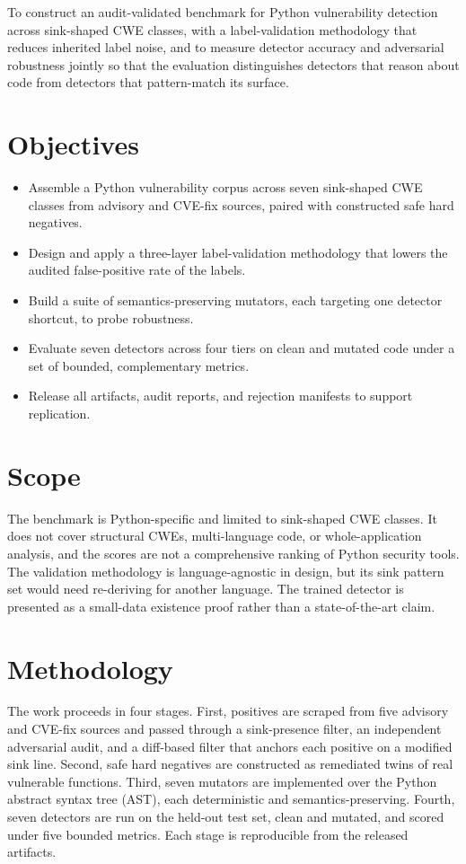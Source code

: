 To construct an audit-validated benchmark for Python vulnerability detection
across sink-shaped CWE classes, with a label-validation methodology that reduces
inherited label noise, and to measure detector accuracy and adversarial
robustness jointly so that the evaluation distinguishes detectors that reason
about code from detectors that pattern-match its surface.

\section{Objectives}

\begin{itemize}
  \item Assemble a Python vulnerability corpus across seven sink-shaped CWE
    classes from advisory and CVE-fix sources, paired with constructed safe
    hard negatives.
  \item Design and apply a three-layer label-validation methodology that
    lowers the audited false-positive rate of the labels.
  \item Build a suite of semantics-preserving mutators, each targeting one
    detector shortcut, to probe robustness.
  \item Evaluate seven detectors across four tiers on clean and mutated code
    under a set of bounded, complementary metrics.
  \item Release all artifacts, audit reports, and rejection manifests to
    support replication.
\end{itemize}

\section{Scope}

The benchmark is Python-specific and limited to sink-shaped CWE classes. It does
not cover structural CWEs, multi-language code, or whole-application analysis,
and the scores are not a comprehensive ranking of Python security tools. The
validation methodology is language-agnostic in design, but its sink pattern set
would need re-deriving for another language. The trained detector is presented
as a small-data existence proof rather than a state-of-the-art claim.

\section{Methodology}

The work proceeds in four stages. First, positives are scraped from five
advisory and CVE-fix sources and passed through a sink-presence filter, an
independent adversarial audit, and a diff-based filter that anchors each
positive on a modified sink line. Second, safe hard negatives are constructed as
remediated twins of real vulnerable functions. Third, seven mutators are
implemented over the Python abstract syntax tree (AST), each deterministic and
semantics-preserving. Fourth, seven detectors are run on the held-out test set,
clean and mutated, and scored under five bounded metrics. Each stage is
reproducible from the released artifacts.

